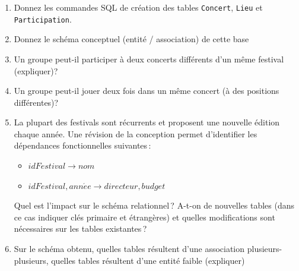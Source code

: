 \begin{enumerate}

\item Donnez les commandes SQL de création des tables \texttt{Concert}, \texttt{Lieu}
    et \texttt{Participation}. 

   \item Donnez le schéma conceptuel (entité / association) de cette base

    \item Un groupe peut-il participer à deux concerts différents d'un même festival (expliquer)?
    \item Un groupe peut-il jouer deux fois dans un même concert (à des positions différentes)?
 
    \item La plupart des festivals sont récurrents et proposent 
     une nouvelle édition chaque année. Une révision de la conception
     permet d'identifier les dépendances fonctionnelles suivantes\,:
     \begin{itemize}
       \item $idFestival \to nom $
       \item $idFestival, ann\acute{e}e \to directeur, budget$
     \end{itemize}
     Quel est l'impact sur le schéma relationnel\,? A-t-on de 
     nouvelles tables (dans ce cas indiquer clés primaire et étrangères) 
     et quelles modifications
     sont nécessaires sur les tables existantes\,?
     
    \item Sur le schéma obtenu, quelles tables résultent d'une
    association plusieurs-plusieurs, quelles tables 
    résultent d'une entité faible (expliquer)
\end{enumerate}

